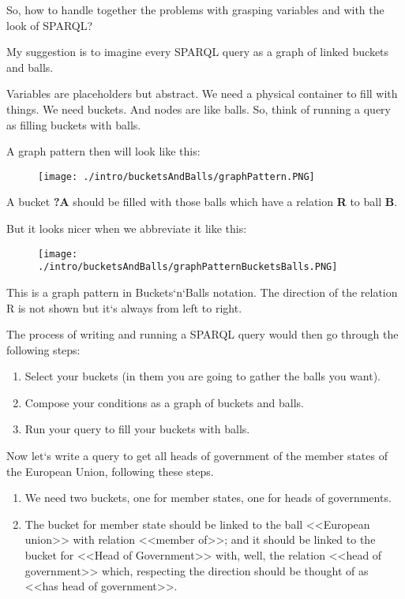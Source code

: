 So, how to handle together the problems with grasping variables and with the look of SPARQL?

My suggestion is to imagine every SPARQL query as a graph of linked buckets and balls.

Variables are placeholders but abstract. We need a physical container to fill with things. We need buckets. And nodes are like balls. So, think of running a query as filling buckets with balls.

A graph pattern then will look like this:

\begin{figure}[h!]
    \texttt{[image: ./intro/bucketsAndBalls/graphPattern.PNG]}
\end{figure}

A bucket \textbf{?A} should be filled with those balls which have a relation \textbf{R} to ball \textbf{B}.

But it looks nicer when we abbreviate it like this:

\begin{figure}[h]
    \texttt{[image: ./intro/bucketsAndBalls/graphPatternBucketsBalls.PNG]}
\end{figure}

This is a graph pattern in Buckets`n`Balls notation. The direction of the relation R is not shown but it`s always from left to right.

The process of writing and running a SPARQL query would then go through the following steps:

\begin{enumerate}
    \item Select your buckets (in them you are going to gather the balls you want).
    \item Compose your conditions as a graph of buckets and balls.
    \item Run your query to fill your buckets with balls.
\end{enumerate}

Now let`s write a query to get all heads of government of the member states of the European Union, following these steps.

\begin{enumerate}
    \item We need two buckets, one for member states, one for heads of governments.
    \item The bucket for member state should be linked to the ball <<European union>> with relation <<member of>>; and it should be linked to the bucket for <<Head of Government>> with, well, the relation <<head of government>> which, respecting the direction should be thought of as <<has head of government>>.
\end{enumerate}

